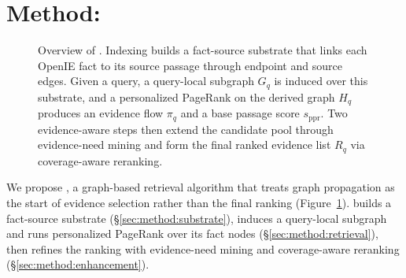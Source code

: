 %
%
%

\section{Method: \methodname{}}
\label{sec:method}

\begin{figure}[t]
\centering
{}
\caption{Overview of \methodname{}. Indexing builds a fact-source
substrate that links each OpenIE fact to its source passage through
endpoint and source edges. Given a query, a query-local subgraph
$G_q$ is induced over this substrate, and a personalized PageRank on
the derived graph $H_q$ produces an evidence flow $\pi_q$ and a base
passage score $s_{\mathrm{ppr}}$. Two evidence-aware steps then
extend the candidate pool through evidence-need mining and
form the final ranked evidence list $R_q$ via coverage-aware
reranking.}
\label{fig:overview}
\end{figure}

We propose \methodname{}, a graph-based retrieval algorithm that
treats graph propagation as the start of evidence selection rather
than the final ranking (Figure~\ref{fig:overview}). \methodname{}
builds a fact-source substrate (\S\ref{sec:method:substrate}),
induces a query-local subgraph and runs personalized PageRank over
its fact nodes (\S\ref{sec:method:retrieval}), then refines the
ranking with evidence-need mining and coverage-aware reranking
(\S\ref{sec:method:enhancement}).

